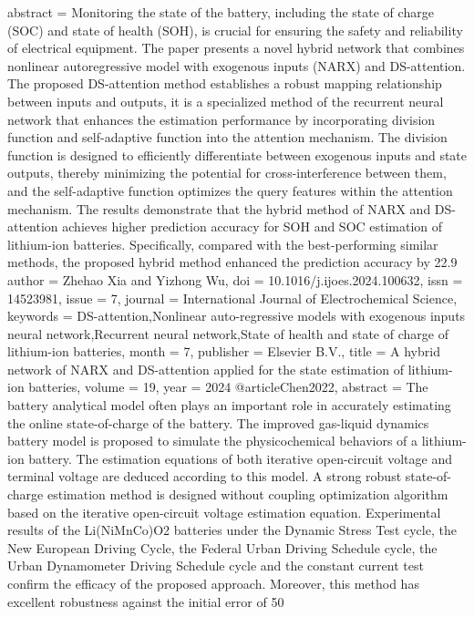 {{   abstract = {Monitoring the state of the battery, including the state of charge (SOC) and state of health (SOH), is crucial for ensuring the safety and reliability of electrical equipment. The paper presents a novel hybrid network that combines nonlinear autoregressive model with exogenous inputs (NARX) and DS-attention. The proposed DS-attention method establishes a robust mapping relationship between inputs and outputs, it is a specialized method of the recurrent neural network that enhances the estimation performance by incorporating division function and self-adaptive function into the attention mechanism. The division function is designed to efficiently differentiate between exogenous inputs and state outputs, thereby minimizing the potential for cross-interference between them, and the self-adaptive function optimizes the query features within the attention mechanism. The results demonstrate that the hybrid method of NARX and DS-attention achieves higher prediction accuracy for SOH and SOC estimation of lithium-ion batteries. Specifically, compared with the best-performing similar methods, the proposed hybrid method enhanced the prediction accuracy by 22.9%
   author = {Zhehao Xia and Yizhong Wu},
   doi = {10.1016/j.ijoes.2024.100632},
   issn = {14523981},
   issue = {7},
   journal = {International Journal of Electrochemical Science},
   keywords = {DS-attention,Nonlinear auto-regressive models with exogenous inputs neural network,Recurrent neural network,State of health and state of charge of lithium-ion batteries},
   month = {7},
   publisher = {Elsevier B.V.},
   title = {A hybrid network of NARX and DS-attention applied for the state estimation of lithium-ion batteries},
   volume = {19},
   year = {2024}
}
@article{Chen2022,
   abstract = {The battery analytical model often plays an important role in accurately estimating the online state-of-charge of the battery. The improved gas-liquid dynamics battery model is proposed to simulate the physicochemical behaviors of a lithium-ion battery. The estimation equations of both iterative open-circuit voltage and terminal voltage are deduced according to this model. A strong robust state-of-charge estimation method is designed without coupling optimization algorithm based on the iterative open-circuit voltage estimation equation. Experimental results of the Li(NiMnCo)O2 batteries under the Dynamic Stress Test cycle, the New European Driving Cycle, the Federal Urban Driving Schedule cycle, the Urban Dynamometer Driving Schedule cycle and the constant current test confirm the efficacy of the proposed approach. Moreover, this method has excellent robustness against the initial error of 50%
}}}}
